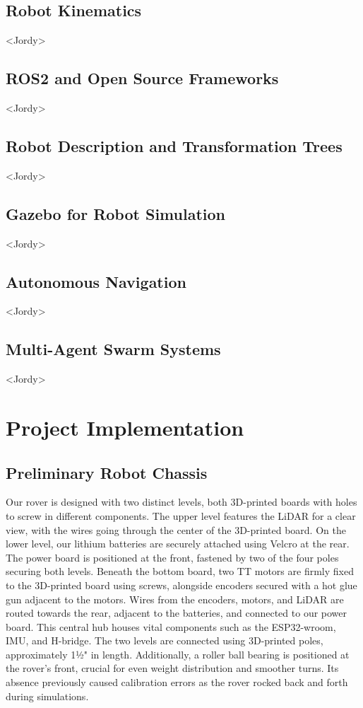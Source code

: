 \documentclass[conference]{IEEEtran}
\begin{document}
\subsection{Robot Kinematics} <Jordy>

\subsection{ROS2 and Open Source Frameworks} <Jordy>

\subsection{Robot Description and Transformation Trees} <Jordy>

\subsection{Gazebo for Robot Simulation} <Jordy>

\subsection{Autonomous Navigation} <Jordy>

\subsection{Multi-Agent Swarm Systems} <Jordy>

\section{Project Implementation}
\subsection{Preliminary Robot Chassis}

Our rover is designed with two distinct levels, both 3D-printed boards with holes to screw in different components. The upper level features the LiDAR for a clear view, with the wires going through the center of the 3D-printed board.
On the lower level, our lithium batteries are securely attached using Velcro at the rear. The power board is positioned at the front, fastened by two of the four poles securing both levels.
Beneath the bottom board,  two TT motors are firmly fixed to the 3D-printed board using screws, alongside encoders secured with a hot glue gun adjacent to the motors. Wires from the encoders, motors, and LiDAR are routed towards the rear, adjacent to the batteries, and connected to our power board. This central hub houses vital components such as the ESP32-wroom, IMU, and H-bridge.
The two levels are connected using 3D-printed poles, approximately 1½" in length. Additionally, a roller ball bearing is positioned at the rover's front, crucial for even weight distribution and smoother turns. Its absence previously caused calibration errors as the rover rocked back and forth during simulations.
\end{document}
